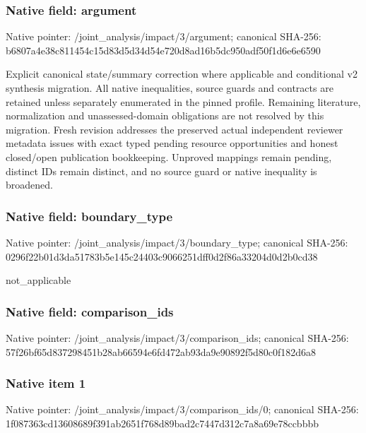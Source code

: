 \documentclass[10pt,a4paper]{article}
\begin{document}
\subsubsection{Native field: argument}
Native pointer: /joint\_\allowbreak{}analysis/impact/3/argument; canonical SHA-256: b6807a4e38c811454c15d83d5d34d54e720d8ad16b5dc950adf50f1d6e6e6590

\begingroup\raggedright\sloppy Explicit canonical state/\allowbreak{}summary correction where applicable and conditional v2 synthesis migration. All native inequalities,\allowbreak{} source guards and contracts are retained unless separately enumerated in the pinned profile. Remaining literature,\allowbreak{} normalization and unassessed-domain obligations are not resolved by this migration. Fresh revision addresses the preserved actual independent reviewer metadata issues with exact typed pending resource opportunities and honest closed/\allowbreak{}open publication bookkeeping. Unproved mappings remain pending,\allowbreak{} distinct IDs remain distinct,\allowbreak{} and no source guard or native inequality is broadened.\par\endgroup

\subsubsection{Native field: boundary\_\allowbreak{}type}
Native pointer: /joint\_\allowbreak{}analysis/impact/3/boundary\_\allowbreak{}type; canonical SHA-256: 0296f22b01d3da51783b5e145c24403c9066251dff0d2f86a33204d0d2b0cd38

\begingroup\raggedright\sloppy not\_\allowbreak{}applicable\par\endgroup

\subsubsection{Native field: comparison\_\allowbreak{}ids}
Native pointer: /joint\_\allowbreak{}analysis/impact/3/comparison\_\allowbreak{}ids; canonical SHA-256: 57f26bf65d837298451b28ab66594e6fd472ab93da9e90892f5d80c0f182d6a8

\subsubsection{Native item 1}
Native pointer: /joint\_\allowbreak{}analysis/impact/3/comparison\_\allowbreak{}ids/0; canonical SHA-256: 1f087363cd13608689f391ab2651f768d89bad2c7447d312c7a8a69e78ccbbbb
\end{document}
